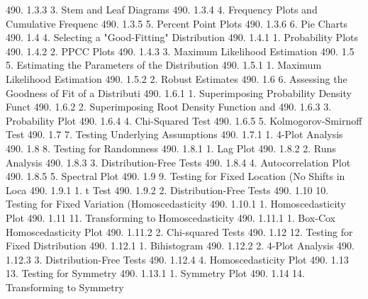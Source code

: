 490.      1.3.3                       3. Stem and Leaf Diagrams
490.      1.3.4                       4. Frequency Plots and Cumulative Frequenc
490.      1.3.5                       5. Percent Point Plots
490.      1.3.6                       6. Pie Charts
490.      1.4                   4. Selecting a "Good-Fitting" Distribution
490.      1.4.1                       1. Probability Plots
490.      1.4.2                       2. PPCC Plots
490.      1.4.3                       3. Maximum Likelihood Estimation
490.      1.5                   5. Estimating the Parameters of the Distribution
490.      1.5.1                       1. Maximum Likelihood Estimation
490.      1.5.2                       2. Robust Estimates
490.      1.6                   6. Assessing the Goodness of Fit of a Distributi
490.      1.6.1                       1. Superimposing Probability Density Funct
490.      1.6.2                       2. Superimposing Root Density Function and
490.      1.6.3                       3. Probability Plot
490.      1.6.4                       4. Chi-Squared Test
490.      1.6.5                       5. Kolmogorov-Smirnoff Test
490.      1.7                   7. Testing Underlying Assumptions
490.      1.7.1                       1. 4-Plot Analysis
490.      1.8                   8. Testing for Randomness
490.      1.8.1                       1. Lag Plot
490.      1.8.2                       2. Runs Analysis
490.      1.8.3                       3. Distribution-Free Tests
490.      1.8.4                       4. Autocorrelation Plot
490.      1.8.5                       5. Spectral Plot
490.      1.9                   9. Testing for Fixed Location (No Shifts in Loca
490.      1.9.1                       1. t Test
490.      1.9.2                       2. Distribution-Free Tests
490.      1.10                 10. Testing for Fixed Variation (Homoscedasticity
490.      1.10.1                      1. Homoscedasticity Plot
490.      1.11                 11. Transforming to Homoscedasticity
490.      1.11.1                      1. Box-Cox Homoscedasticity Plot
490.      1.11.2                      2. Chi-squared Tests
490.      1.12                 12. Testing for Fixed Distribution
490.      1.12.1                      1. Bihistogram
490.      1.12.2                      2. 4-Plot Analysis
490.      1.12.3                      3. Distribution-Free Tests
490.      1.12.4                      4. Homoscedasticity Plot
490.      1.13                 13. Testing for Symmetry
490.      1.13.1                      1. Symmetry Plot
490.      1.14                 14. Transforming to Symmetry
